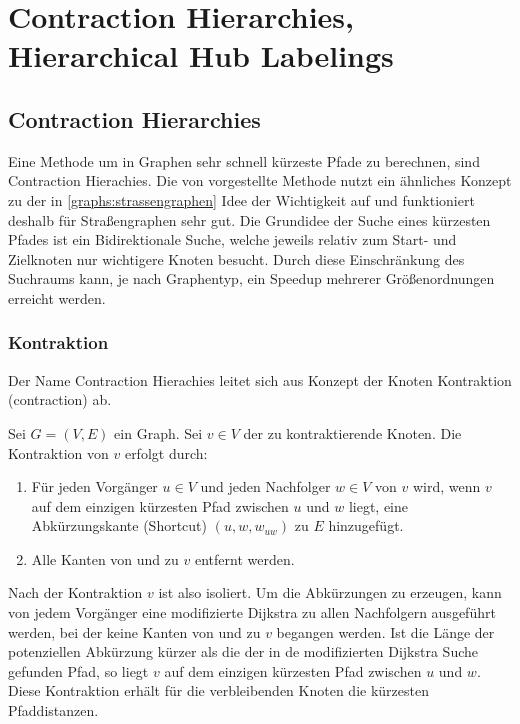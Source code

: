 \chapter{Contraction Hierarchies, Hierarchical Hub Labelings}\label{chapter:ch}


\section{Contraction Hierarchies}
Eine Methode um in Graphen sehr schnell kürzeste Pfade zu berechnen, sind Contraction Hierachies.
Die von \cite{geisberger2008contraction} vorgestellte Methode nutzt ein ähnliches Konzept zu der in \autoref{graphs:strassengraphen} Idee der Wichtigkeit auf und funktioniert deshalb für Straßengraphen sehr gut.
Die Grundidee der Suche eines kürzesten Pfades ist ein Bidirektionale Suche, welche jeweils relativ zum Start- und Zielknoten nur wichtigere Knoten besucht.
Durch diese Einschränkung des Suchraums kann, je nach Graphentyp, ein Speedup mehrerer Größenordnungen erreicht werden.

\subsection{Kontraktion}

Der Name Contraction Hierachies leitet sich aus Konzept der Knoten Kontraktion (contraction) ab.

\begin{definition}
    Sei $G = (V, E)$ ein Graph. Sei $v \in V$ der zu kontraktierende Knoten. Die Kontraktion von $v$ erfolgt durch:

    \begin{enumerate}
        \item\label{ch:contraction:when_shortcut}
        Für jeden Vorgänger $u \in V$ und jeden Nachfolger $w \in V$ von $v$ wird, wenn $v$ auf dem einzigen kürzesten Pfad zwischen $u$ und $w$ liegt, eine Abkürzungskante (Shortcut) $(u, w, w_{uw})$ zu $E$ hinzugefügt.

        \item
              Alle Kanten von und zu $v$ entfernt werden.
    \end{enumerate}
\end{definition}

Nach der Kontraktion $v$ ist also isoliert.
Um die Abkürzungen zu erzeugen, kann von jedem Vorgänger eine modifizierte Dijkstra zu allen Nachfolgern ausgeführt werden, bei der keine Kanten von und zu $v$ begangen werden.
Ist die Länge der potenziellen Abkürzung kürzer als die der in de modifizierten Dijkstra Suche gefunden Pfad, so liegt $v$ auf dem einzigen kürzesten Pfad zwischen $u$ und $w$.
Diese Kontraktion erhält für die verbleibenden Knoten die kürzesten Pfaddistanzen.


